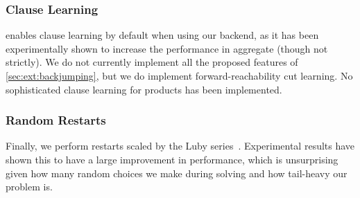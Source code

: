 \subsubsection{Clause Learning}\label{sec:clause-learning}

\Catra{} enables clause learning by default when using our backend, as it has
been experimentally shown to increase the performance in aggregate (though not
strictly). We do not currently implement all the proposed features of
\cref{sec:ext:backjumping}, but we do implement forward-reachability cut
learning. No sophisticated clause learning for products has been implemented.

\subsubsection{Random Restarts}\label{sec:random-restarts}

Finally, we perform restarts scaled by the Luby series~\cite{luby}. Experimental
results have shown this to have a large improvement in performance, which is
unsurprising given how many random choices we make during solving and how
tail-heavy our problem is.

